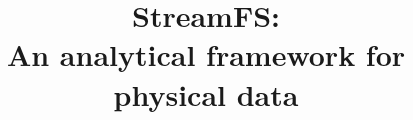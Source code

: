\documentclass[10pt,print,letterpaper]{sigplan-proc-varsize}
\begin{document}

\title{StreamFS:\\An analytical framework for physical data}



%
%
%
%
%
\end{document}
